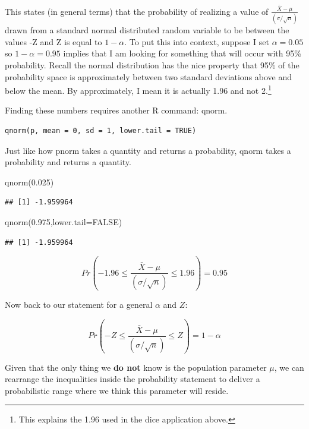 \documentclass[
]{book}
\newenvironment{Shaded}{\begin{snugshade}}{\end{snugshade}}
\newcommand{\AttributeTok}[1]{\textcolor[rgb]{0.77,0.63,0.00}{#1}}
\newcommand{\ConstantTok}[1]{\textcolor[rgb]{0.00,0.00,0.00}{#1}}
\newcommand{\FloatTok}[1]{\textcolor[rgb]{0.00,0.00,0.81}{#1}}
\newcommand{\FunctionTok}[1]{\textcolor[rgb]{0.00,0.00,0.00}{#1}}
\newcommand{\NormalTok}[1]{#1}
\begin{document}
This states (in general terms) that the probability of realizing a value of \(\frac{\bar{X}-\mu}{(\sigma/\sqrt{n})}\) drawn from a standard normal distributed random variable to be between the values -Z and Z is equal to \(1-\alpha\). To put this into context, suppose I set \(\alpha=0.05\) so \(1-\alpha=0.95\) implies that I am looking for something that will occur with 95\% probability. Recall the normal distribution has the nice property that 95\% of the probability space is approximately between two standard deviations above and below the mean. By approximately, I mean it is actually 1.96 and not 2.\footnote{This explains the 1.96 used in the dice application above.}

Finding these numbers requires another R command: qnorm.

\begin{verbatim}
qnorm(p, mean = 0, sd = 1, lower.tail = TRUE)
\end{verbatim}

Just like how pnorm takes a quantity and returns a probability, qnorm takes a probability and returns a quantity.

\begin{Shaded}
\begin{Highlighting}[]
\FunctionTok{qnorm}\NormalTok{(}\FloatTok{0.025}\NormalTok{)}
\end{Highlighting}
\end{Shaded}

\begin{verbatim}
## [1] -1.959964
\end{verbatim}

\begin{Shaded}
\begin{Highlighting}[]
\FunctionTok{qnorm}\NormalTok{(}\FloatTok{0.975}\NormalTok{,}\AttributeTok{lower.tail=}\ConstantTok{FALSE}\NormalTok{)}
\end{Highlighting}
\end{Shaded}

\begin{verbatim}
## [1] -1.959964
\end{verbatim}

\[Pr\left(-1.96 \leq \frac{\bar{X}-\mu}{(\sigma/\sqrt{n})} \leq 1.96\right)=0.95\]

Now back to our statement for a general \(\alpha\) and \(Z\):

\[Pr\left(-Z \leq \frac{\bar{X}-\mu}{(\sigma/\sqrt{n})} \leq Z\right)=1-\alpha\]

Given that the only thing we \textbf{do not} know is the population parameter \(\mu\), we can rearrange the inequalities inside the probability statement to deliver a probabilistic range where we think this parameter will reside.
\end{document}
